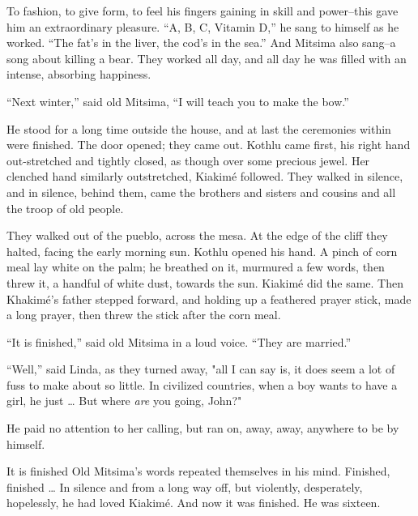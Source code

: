 \documentclass[12pt]{report}
\begin{document}
To fashion, to give form, to feel his fingers gaining in skill and
power--this gave him an extraordinary pleasure. ``A, B, C, Vitamin D,''
he sang to himself as he worked. ``The fat's in the liver, the cod's in
the sea.'' And Mitsima also sang--a song about killing a bear. They
worked all day, and all day he was filled with an intense, absorbing
happiness.

``Next winter,'' said old Mitsima, ``I will teach you to make the bow.''

He stood for a long time outside the house, and at last the ceremonies
within were finished. The door opened; they came out. Kothlu came first,
his right hand out-stretched and tightly closed, as though over some
precious jewel. Her clenched hand similarly outstretched, Kiakimé
followed. They walked in silence, and in silence, behind them, came the
brothers and sisters and cousins and all the troop of old people.

They walked out of the pueblo, across the mesa. At the edge of the cliff
they halted, facing the early morning sun. Kothlu opened his hand. A
pinch of corn meal lay white on the palm; he breathed on it, murmured a
few words, then threw it, a handful of white dust, towards the sun.
Kiakimé did the same. Then Khakimé's father stepped forward, and holding
up a feathered prayer stick, made a long prayer, then threw the stick
after the corn meal.

``It is finished,'' said old Mitsima in a loud voice. ``They are
married.''

``Well,'' said Linda, as they turned away, "all I can say is, it does
seem a lot of fuss to make about so little. In civilized countries, when
a boy wants to have a girl, he just \ldots{} But where \emph{are} you
going, John?"

He paid no attention to her calling, but ran on, away, away, anywhere to
be by himself.

It is finished Old Mitsima's words repeated themselves in his mind.
Finished, finished \ldots{} In silence and from a long way off, but
violently, desperately, hopelessly, he had loved Kiakimé. And now it was
finished. He was sixteen.
\end{document}
